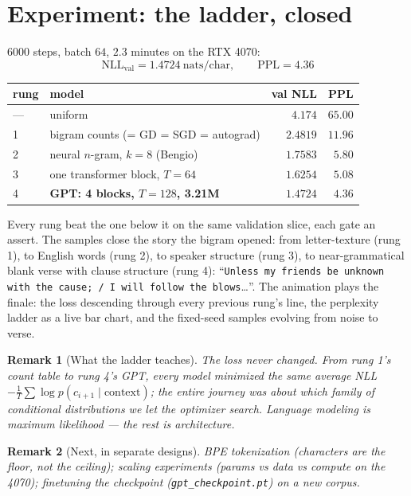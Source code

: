 \documentclass[11pt]{article}
\newtheorem{remark}{Remark}
\begin{document}
\section{Experiment: the ladder, closed}

$6000$ steps, batch $64$, $2.3$ minutes on the RTX 4070:
\begin{equation}
  \boxed{\;\mathrm{NLL}_{\mathrm{val}} = 1.4724 \ \text{nats/char},
  \qquad \mathrm{PPL} = 4.36\;}
  \label{eq:result}
\end{equation}

\begin{center}
\begin{tabular}{llrr}
\toprule
rung & model & val NLL & PPL\\
\midrule
--- & uniform & $4.174$ & $65.00$\\
1 & bigram counts (= GD = SGD = autograd) & $2.4819$ & $11.96$\\
2 & neural $n$-gram, $k{=}8$ (Bengio) & $1.7583$ & $5.80$\\
3 & one transformer block, $T{=}64$ & $1.6254$ & $5.08$\\
4 & \textbf{GPT: 4 blocks, $T{=}128$, 3.21M} & $\mathbf{1.4724}$
  & $\mathbf{4.36}$\\
\bottomrule
\end{tabular}
\end{center}

Every rung beat the one below it on the same validation slice, each
gate an assert. The samples close the story the bigram opened: from
letter-texture (rung 1), to English words (rung 2), to speaker
structure (rung 3), to near-grammatical blank verse with clause
structure (rung 4): ``\texttt{Unless my friends be unknown with the
cause; / I will follow the blows}\ldots''. The animation plays the
finale: the loss descending through every previous rung's line, the
perplexity ladder as a live bar chart, and the fixed-seed samples
evolving from noise to verse.

\begin{remark}[What the ladder teaches]
The loss never changed. From rung 1's count table to rung 4's GPT,
every model minimized the same average NLL
$-\frac1T\sum\log p(c_{i+1}\mid \mathrm{context})$; the entire journey
was about \emph{which family of conditional distributions} we let the
optimizer search. Language modeling is maximum likelihood --- the rest
is architecture.
\end{remark}

\begin{remark}[Next, in separate designs]
BPE tokenization (characters are the floor, not the ceiling); scaling
experiments (params vs data vs compute on the 4070); finetuning the
checkpoint (\texttt{gpt\_checkpoint.pt}) on a new corpus.
\end{remark}
\end{document}
